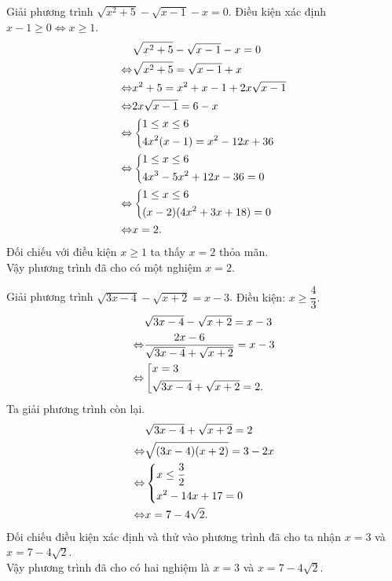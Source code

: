 \begin{bt}%
	Giải phương trình $\sqrt{x^2 + 5} - \sqrt{x - 1} - x = 0$.
	\loigiai
	{
		Điều kiện xác định $x - 1 \geq 0 \Leftrightarrow x \geq 1$.
		\begin{align*}
		& \sqrt{x^2 + 5} - \sqrt{x - 1} - x = 0 \\
		\Leftrightarrow & \sqrt{x^2 + 5} = \sqrt{x - 1} + x \\
		\Leftrightarrow & x^2 + 5 = x^2 + x - 1 + 2x \sqrt{x - 1} \\
		\Leftrightarrow & 2x \sqrt{x - 1} = 6 - x \\
		\Leftrightarrow & \left\{\begin{aligned}& 1 \leq x \leq 6 \\& 4x^2(x - 1) = x^2 - 12x + 36\end{aligned}\right. \\
		\Leftrightarrow & \left\{\begin{aligned}& 1 \leq x \leq 6 \\& 4x^3 - 5x^2 + 12x - 36 = 0\end{aligned}\right. \\
		\Leftrightarrow & \left\{\begin{aligned}& 1 \leq x \leq 6 \\& (x - 2)(4x^2 + 3x + 18) = 0\end{aligned}\right. \\
		\Leftrightarrow & x = 2.
		\end{align*}
		Đối chiếu với điều kiện $x \geq 1$ ta thấy $x = 2$ thỏa mãn.\\
		Vậy phương trình đã cho có một nghiệm $x = 2$.
	}
\end{bt}


\begin{bt}%
	Giải phương trình $ \sqrt{3x-4}-\sqrt{x+2}=x-3$.
	\loigiai
	{Điều kiện: $ x \geq \dfrac{4}{3}$.
		\begin{align*}
		& \sqrt{3x-4}-\sqrt{x+2}=x-3 \\
		\Leftrightarrow & \dfrac{2x-6}{\sqrt{3x-4}+\sqrt{x+2}}=x-3 \\
		\Leftrightarrow & \left[\begin{aligned}&x=3 \\& \sqrt{3x-4}+\sqrt{x+2}=2.\end{aligned}\right.
		\end{align*}Ta giải phương trình còn lại.
		\begin{align*}
		& \sqrt{3x-4}+\sqrt{x+2}=2 \\
		\Leftrightarrow & \sqrt{(3x-4)(x+2)}=3-2x \\
		\Leftrightarrow & \left\{\begin{aligned}& x\le \dfrac{3}{2} \\&x^2-14x+17=0\end{aligned}\right. \\
		\Leftrightarrow & x=7-4\sqrt{2}.
		\end{align*}Đối chiếu điều kiện xác định và thử vào phương trình đã cho ta nhận $x = 3$ và $x = 7 - 4\sqrt{2}$.\\
		Vậy phương trình đã cho có hai nghiệm là $ x=3 $ và $x = 7-4\sqrt{2}$.
	}
\end{bt}


